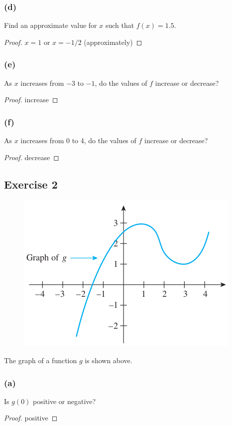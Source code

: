 \documentclass[14pt]{extarticle}
\begin{document}
\subsubsection{(d)}
Find an approximate value for \(x\) such that \(f(x) = 1.5\).
\begin{proof}
\(x = 1\) or \(x = -1/2\) (approximately)
\end{proof}

\subsubsection{(e)}
As \(x\) increases from \(-3\) to \(-1\), do the values of \(f\) increase or decrease?

\begin{proof}
increase
\end{proof}

\subsubsection{(f)}
As \(x\) increases from 0 to 4, do the values of \(f\) increase or decrease?

\begin{proof}
decrease
\end{proof}

\subsection{Exercise 2}
\begin{figure}[ht!]
\centering
\includegraphics[scale=0.5]{../images/11.1.2.png}
\end{figure}

The graph of a function \(g\) is shown above.

\subsubsection{(a)}
Is \(g(0)\) positive or negative?
\begin{proof}
positive
\end{proof}
\end{document}
